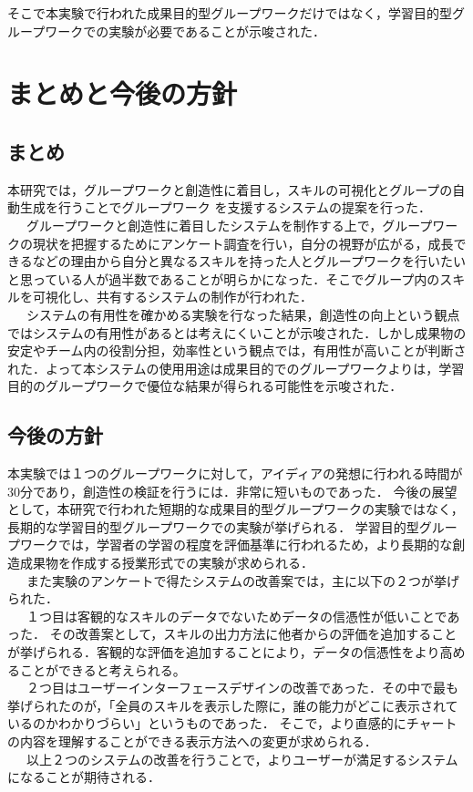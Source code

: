 \documentclass{funthesis}
\begin{document}
そこで本実験で行われた成果目的型グループワークだけではなく，学習目的型グループワークでの実験が必要であることが示唆された．


\chapter{まとめと今後の方針}
\section{まとめ}
本研究では，グループワークと創造性に着目し，スキルの可視化とグループの自動生成を行うことでグループワーク
を支援するシステムの提案を行った．\\
\ \ \ グループワークと創造性に着目したシステムを制作する上で，グループワークの現状を把握するためにアンケート調査を行い，自分の視野が広がる，成長できるなどの理由から自分と異なるスキルを持った人とグループワークを行いたいと思っている人が過半数であることが明らかになった．そこでグループ内のスキルを可視化し、共有するシステムの制作が行われた．\\
\ \ \ システムの有用性を確かめる実験を行なった結果，創造性の向上という観点ではシステムの有用性があるとは考えにくいことが示唆された．しかし成果物の安定やチーム内の役割分担，効率性という観点では，有用性が高いことが判断された．よって本システムの使用用途は成果目的でのグループワークよりは，学習目的のグループワークで優位な結果が得られる可能性を示唆された．

\section{今後の方針}
本実験では１つのグループワークに対して，アイディアの発想に行われる時間が30分であり，創造性の検証を行うには．非常に短いものであった．
今後の展望として，本研究で行われた短期的な成果目的型グループワークの実験ではなく，長期的な学習目的型グループワークでの実験が挙げられる．
学習目的型グループワークでは，学習者の学習の程度を評価基準に行われるため，より長期的な創造成果物を作成する授業形式での実験が求められる．\\
\ \ \ また実験のアンケートで得たシステムの改善案では，主に以下の２つが挙げられた．\\
\ \ \ １つ目は客観的なスキルのデータでないためデータの信憑性が低いことであった．
その改善案として，スキルの出力方法に他者からの評価を追加することが挙げられる．客観的な評価を追加することにより，データの信憑性をより高めることができると考えられる。\\
\ \ \ ２つ目はユーザーインターフェースデザインの改善であった．その中で最も挙げられたのが，「全員のスキルを表示した際に，誰の能力がどこに表示されているのかわかりづらい」というものであった．
そこで，より直感的にチャートの内容を理解することができる表示方法への変更が求められる．\\
\ \ \ 以上２つのシステムの改善を行うことで，よりユーザーが満足するシステムになることが期待される．
\end{document}
